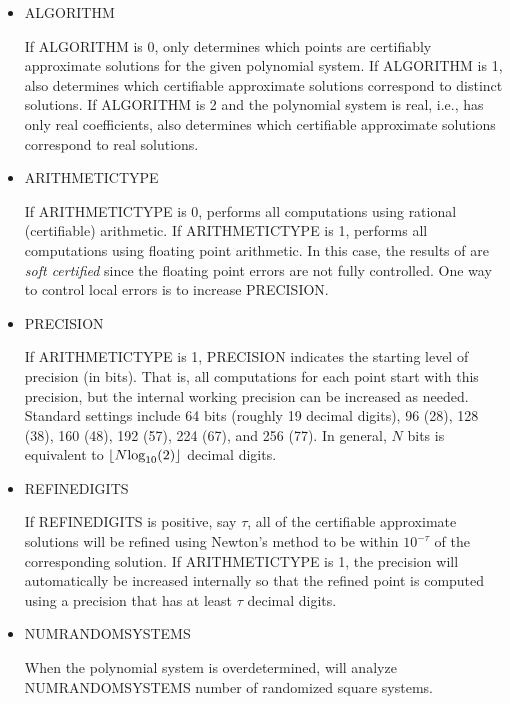 \documentclass[11pt]{report}
\begin{document}
\vskip 0.1in
\begin{itemize}

\item ALGORITHM

If ALGORITHM is 0, \blueharvestS only determines which points are certifiably approximate solutions for the given polynomial system.
If ALGORITHM is 1, \blueharvestS also determines which certifiable approximate solutions correspond to distinct solutions.
If ALGORITHM is 2 and the polynomial system is real, i.e., has only real coefficients, \blueharvestS
also determines which certifiable approximate solutions correspond to real solutions.

\item ARITHMETICTYPE

If ARITHMETICTYPE is 0, \blueharvestS performs all computations using rational (certifiable) arithmetic.
If ARITHMETICTYPE is 1, \blueharvestS performs all computations using floating point arithmetic.
In this case, the results of \blueharvestS are {\it soft certified} since the floating point errors
are not fully controlled.  One way to control local errors is to increase PRECISION.

\item PRECISION

If ARITHMETICTYPE is 1, PRECISION indicates the starting level of precision (in bits).
That is, all computations for each point start with this precision, but the internal working precision
can be increased as needed.
Standard settings include 64 bits (roughly 19 decimal digits), 96 (28), 128 (38), 160 (48), 192 (57), 224 (67), and 256 (77).
In general, $N$ bits is equivalent to $\left\lfloor N\hbox{log}_{10}(2)\right\rfloor$ decimal digits.

\item REFINEDIGITS

If REFINEDIGITS is positive, say $\tau$, all of the certifiable approximate solutions will be refined
using Newton's method to be within $10^{-\tau}$ of the corresponding solution.  If ARITHMETICTYPE is 1,
the precision will automatically be increased internally so that the refined point is computed using
a precision that has at least $\tau$ decimal digits.

\item NUMRANDOMSYSTEMS

When the polynomial system is overdetermined, \blueharvestS will analyze NUMRANDOMSYSTEMS
number of randomized square systems.


\end{itemize}
\end{document}
